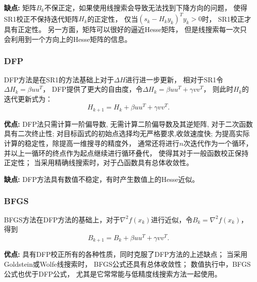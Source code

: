     \textbf{缺点:}
        矩阵$B_k$不保正定，如果使用线搜索会导致无法找到下降方向的问题，
        使得SR1校正不保持迭代矩阵$H_k$的正定性，
        仅当$(s_k-H_ky_k)^Ty_k>0$时，
        SR1校正才具有正定性。
        另一方面，矩阵可以很好的逼近Hesse矩阵，
        但是线搜索每一次只会利用到一个方向上的Hesse矩阵的信息。
        
\subsubsection{DFP}
    DFP方法\cite{1963A}是在SR1的方法基础上对于$\Delta H$进行进一步更新，
    相对于SR1令$\Delta H_k = \beta uu^T$，
    DFP提供了更大的自由度，令$\Delta H_k = \beta uu^T + \gamma vv^T$，
    则此时$H_k$的迭代更新式为：
    \begin{equation}
        H_{k+1} = H_{k} + \beta uu^T + \gamma vv^T.
        \nonumber
    \end{equation}
    
    \textbf{优点:}
        DFP法只需计算一阶偏导数,
        无需计算二阶偏导数及其逆矩阵,
        对于二次函数具有二次终止性;
        对目标函式的初始点选择均无严格要求,收敛速度快;
        为提高实际计算的稳定性，除提高一维搜寻的精度外，
        通常还将进行$n$次迭代作为一个循环，
        并以上一循环的终点作为起点继续进行循环叠代，
        使得其对于一般函数校正保持正定性；
        当采用精确线搜索时，对于凸函数具有总体收敛性。
    
    \textbf{缺点:}
        DFP方法具有数值不稳定，有时产生数值上的Hesse近似。
        
\subsubsection{BFGS}
    BFGS方法\cite{1989On}在DFP方法的基础上，对于$\nabla^2f(x_k)$进行近似，令$B_k=\nabla^2f(x_k)$，得到
    \begin{equation}
        B_{k+1} = B_k + \beta uu^T + \gamma vv^T.
        \nonumber
    \end{equation}
    
    \textbf{优点:}
        具有DFP校正所有的各种性质，同时克服了DFP方法的上述缺点；
        当采用Goldstein或Wolfe线搜索时，
        BFGS公式还具有总体收敛性；
        数值执行中，BFGS公式也优于DFP公式，
        尤其是它常常能与低精度线搜索方法一起使用。
    
